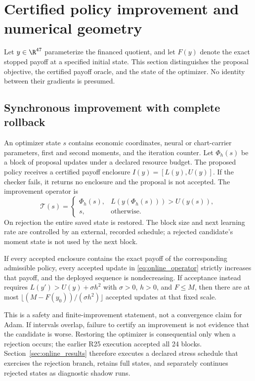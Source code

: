 \section{Certified policy improvement and numerical geometry}\label{sec:method}
Let $y\in\R^{47}$ parameterize the financed quotient, and let $F(y)$ denote the exact stopped payoff at a specified initial state. This section distinguishes the proposal objective, the certified payoff oracle, and the state of the optimizer. No identity between their gradients is presumed.

\subsection{Synchronous improvement with complete rollback}\label{sec:rollback}
An optimizer state $s$ contains economic coordinates, neural or chart-carrier parameters, first and second moments, and the iteration counter. Let $\Phi_h(s)$ be a block of proposal updates under a declared resource budget. The proposed policy receives a certified payoff enclosure $I(y)=[L(y),U(y)]$. If the checker fails, it returns no enclosure and the proposal is not accepted. The improvement operator is
\begin{equation}
 \mathcal T(s)=
 \begin{cases}
 \Phi_h(s),&L(y(\Phi_h(s)))>U(y(s)),\\
 s,&\text{otherwise}.
 \end{cases}\label{eq:online_operator}
\end{equation}
On rejection the entire saved state is restored. The block size and next learning rate are controlled by an external, recorded schedule; a rejected candidate's moment state is not used by the next block.

\begin{proposition}\label{prop:monotone}
If every accepted enclosure contains the exact payoff of the corresponding admissible policy, every accepted update in \eqref{eq:online_operator} strictly increases that payoff, and the deployed sequence is nondecreasing. If acceptance instead requires $L(y')>U(y)+\sigma h^2$ with $\sigma>0$, $h>0$, and $F\leq M$, then there are at most $\lfloor(M-F(y_0))/(\sigma h^2)\rfloor$ accepted updates at that fixed scale.
\end{proposition}
This is a safety and finite-improvement statement, not a convergence claim for Adam. If intervals overlap, failure to certify an improvement is not evidence that the candidate is worse. Restoring the optimizer is consequential only when a rejection occurs; the earlier R25 execution accepted all 24 blocks. Section~\ref{sec:online_results} therefore executes a declared stress schedule that exercises the rejection branch, retains full states, and separately continues rejected states as diagnostic shadow runs.

